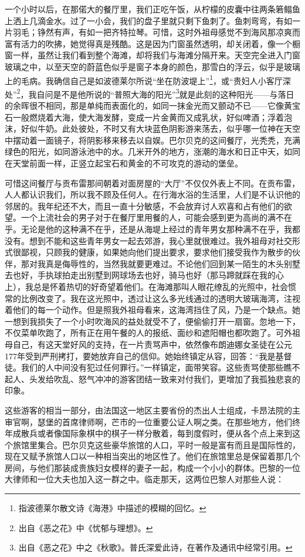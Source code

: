 \par 一个小时以后，在那偌大的餐厅里，我们正吃午饭，从柠檬的皮囊中往两条箬鳎鱼上洒上几滴金水。过了一小会，我们的盘子里就只剩下鱼刺了。鱼刺弯弯，有如一片羽毛；铮然有声，有如一把齐特拉琴。可惜，这时外祖母感觉不到海风那凉爽而富有活力的吹拂，她觉得真是残酷。这是因为门窗虽然透明，却关闭着，像一个橱窗一样，虽然让我们看到整个海滩，却将我们与海滩分隔开来。天空完全进入门窗玻璃之中，以至天空的蔚蓝色似乎是窗子本身的颜色，那雪白的浮云，似乎是玻璃上的毛病。我确信自己是如波德莱尔所说“坐在防波堤上”\footnote{指波德莱尔散文诗《海港》中描述的模糊的回忆。}，或“贵妇人小客厅深处”\footnote{出自《恶之花》中《忧郁与理想》。}，我自问是不是他所说的“普照大海的阳光”\footnote{出自《恶之花》中之《秋歌》。普氏深爱此诗，在著作及通讯中经常引用。}就是此刻的这种阳光——与落日的余晖很不相同，那是单纯而表面化的，如同一抹金光而又颤动不已——它像黄宝石一般燃烧着大海，使大海发酵，变成一片金黄而又成乳状，好似啤酒；浮着泡沫，好似牛奶。此处彼处，不时又有大块蓝色阴影游来荡去，似乎哪一位神在天空中摆动着一面镜子，将阴影移来移去以自娱。巴尔贝克的这间餐厅，光秃秃，充满绿色的阳光，如同游泳池中的水。几米开外的地方，涨潮的海水和日正中天，如同在天堂前面一样，正竖立起宝石和黄金的不可攻克的游动的堡垒。
\par 可惜这间餐厅与贡布雷那间朝着对面房屋的“大厅”不仅仅外表上不同。在贡布雷，人人都认识我们，所以我不顾及任何人。在行海水浴的生活里，人们是不认识他的邻居的。我年纪还不大，而且一直十分敏感，不会放弃讨人欢喜和占有他们的欲望。一个上流社会的男子对于在餐厅里用餐的人，可能会感到更为高尚的满不在乎。无论是他的这种满不在乎，还是从海堤上经过的青年男女那种满不在乎，我都没有。想到不能和这些青年男女一起去郊游，我心里就很难过。我外祖母对社交形式很鄙视，只顾我的健康，如果她向他们提出要求，要求他们接受我作为散步的伙伴，那对我真是侮辱性的，当然我就要更难过。不论他们回到某一陌生的木头别墅去也好，手执球拍走出别墅到网球场去也好，骑马也好（那马蹄就踩在我的心上），我总是怀着热切的好奇望着他们。在海滩那叫人眼花缭乱的光照中，社会惯常的比例改变了。我在这光照中，透过让这么多光线通过的透明大玻璃海湾，注视着他们的每一个动作。但是照我外祖母看来，这海湾挡住了风，乃是一个缺点。她一想到我损失了一个小时吹海风的益处就受不了，便偷偷打开一扇窗。忽地一下，不仅菜单吹跑了，所有正在用午餐的人的报纸、面纱和遮阳帽也都吹跑了。可外祖母自己，有这天堂好风的支持，在一片责骂声中，依然像布朗迪娜女圣徒在公元177年受到严刑拷打，要她放弃自己的信仰。她始终镇定从容，回答：“我是基督徒。我们的人中间没有犯过任何罪行。”一样镇定，面带笑容。这些责骂使那些瞧不起人、头发给吹乱、怒气冲冲的游客团结一致来对付我们，更增加了我孤独悲哀的印象。
\par 这些游客的相当一部分，由法国这一地区主要省份的杰出人士组成，卡昂法院的主审官啊，瑟堡的首席律师啊，芒市的一位重要公证人啊之类。在那些地方，他们终年成散兵或者像国际象棋中的棋子一样分散着，每到度假时，便从各个点上来到这个旅馆里集合。巴尔贝克这些豪华旅馆的人口，平时一般是富有而且是国际性的，现在又赋予旅馆人口以一种相当突出的地区性了。他们在旅馆里总是保留着那几个房间，与他们那装成贵族妇女模样的妻子一起，构成一个小小的群体。巴黎的一位大律师和一位大夫也加入这一群之中。临走那天，这两位巴黎人对那些人说：
